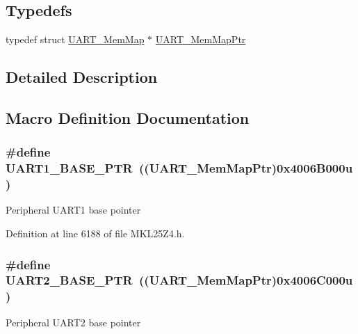 \subsection*{Typedefs}
\begin{DoxyCompactItemize}
\item 
typedef struct \hyperlink{struct_u_a_r_t___mem_map}{U\+A\+R\+T\+\_\+\+Mem\+Map} $\ast$ \hyperlink{group___u_a_r_t___peripheral_ga306cf44b593fadbb29a065f42e3f68f0}{U\+A\+R\+T\+\_\+\+Mem\+Map\+Ptr}
\end{DoxyCompactItemize}


\subsection{Detailed Description}


\subsection{Macro Definition Documentation}
\subsubsection[{\texorpdfstring{U\+A\+R\+T1\+\_\+\+B\+A\+S\+E\+\_\+\+P\+TR}{UART1_BASE_PTR}}]{\setlength{\rightskip}{0pt plus 5cm}\#define U\+A\+R\+T1\+\_\+\+B\+A\+S\+E\+\_\+\+P\+TR~(({\bf U\+A\+R\+T\+\_\+\+Mem\+Map\+Ptr})0x4006\+B000u)}\hypertarget{group___u_a_r_t___peripheral_gafb5b1236c1cdf2d9a6464251b791030c}{}\label{group___u_a_r_t___peripheral_gafb5b1236c1cdf2d9a6464251b791030c}
Peripheral U\+A\+R\+T1 base pointer 

Definition at line 6188 of file M\+K\+L25\+Z4.\+h.

\subsubsection[{\texorpdfstring{U\+A\+R\+T2\+\_\+\+B\+A\+S\+E\+\_\+\+P\+TR}{UART2_BASE_PTR}}]{\setlength{\rightskip}{0pt plus 5cm}\#define U\+A\+R\+T2\+\_\+\+B\+A\+S\+E\+\_\+\+P\+TR~(({\bf U\+A\+R\+T\+\_\+\+Mem\+Map\+Ptr})0x4006\+C000u)}\hypertarget{group___u_a_r_t___peripheral_ga75ca2ea4e490b3c1c7aa55fc9c25cd37}{}\label{group___u_a_r_t___peripheral_ga75ca2ea4e490b3c1c7aa55fc9c25cd37}
Peripheral U\+A\+R\+T2 base pointer 

